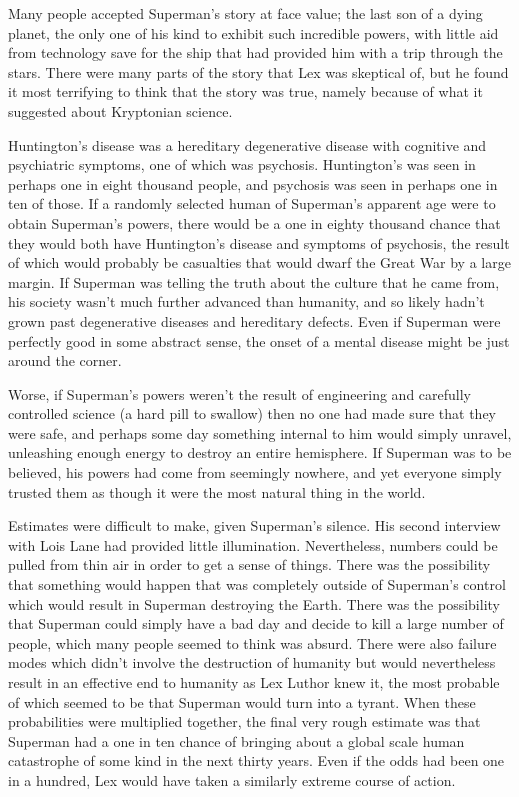 Many people accepted Superman's story at face value; the last son of a
dying planet, the only one of his kind to exhibit such incredible
powers, with little aid from technology save for the ship that had
provided him with a trip through the stars. There were many parts of the
story that Lex was skeptical of, but he found it most terrifying to
think that the story was true, namely because of what it suggested about
Kryptonian science.

Huntington's disease was a hereditary degenerative disease with
cognitive and psychiatric symptoms, one of which was psychosis.
Huntington's was seen in perhaps one in eight thousand people, and
psychosis was seen in perhaps one in ten of those. If a randomly
selected human of Superman's apparent age were to obtain Superman's
powers, there would be a one in eighty thousand chance that they would
both have Huntington's disease and symptoms of psychosis, the result of
which would probably be casualties that would dwarf the Great War by a
large margin. If Superman was telling the truth about the culture that
he came from, his society wasn't much further advanced than humanity,
and so likely hadn't grown past degenerative diseases and hereditary
defects. Even if Superman were perfectly good in some abstract sense,
the onset of a mental disease might be just around the corner.

Worse, if Superman's powers weren't the result of engineering and
carefully controlled science (a hard pill to swallow) then no one had
made sure that they were safe, and perhaps some day something internal
to him would simply unravel, unleashing enough energy to destroy an
entire hemisphere. If Superman was to be believed, his powers had come
from seemingly nowhere, and yet everyone simply trusted them as though
it were the most natural thing in the world.

Estimates were difficult to make, given Superman's silence. His second
interview with Lois Lane had provided little illumination. Nevertheless,
numbers could be pulled from thin air in order to get a sense of things.
There was the possibility that something would happen that was
completely outside of Superman's control which would result in Superman
destroying the Earth. There was the possibility that Superman could
simply have a bad day and decide to kill a large number of people, which
many people seemed to think was absurd. There were also failure modes
which didn't involve the destruction of humanity but would nevertheless
result in an effective end to humanity as Lex Luthor knew it, the most
probable of which seemed to be that Superman would turn into a tyrant.
When these probabilities were multiplied together, the final very rough
estimate was that Superman had a one in ten chance of bringing about a
global scale human catastrophe of some kind in the next thirty years.
Even if the odds had been one in a hundred, Lex would have taken a
similarly extreme course of action.

